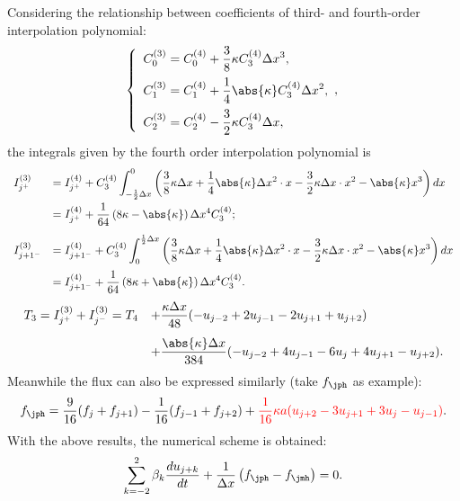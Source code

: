 \documentclass[]{article}
\begin{document}
Considering the relationship between coefficients of third- and fourth-order
interpolation polynomial:
\begin{equation}
  \left\{\begin{array}{l}
  \displaystyle
  C_0^{(3)}=C_0^{(4)}+\frac{3}{8}\kappa C_3^{(4)}\Delta x^3, \\[3mm]
  \displaystyle
  C_1^{(3)}=C_1^{(4)}+\frac{1}{4}\abs{\kappa} C_3^{(4)}\Delta x^2, \\[3mm]
  \displaystyle
  C_2^{(3)}=C_2^{(4)}-\frac{3}{2}\kappa C_3^{(4)}\Delta x, \\
  \end{array},\right. 
  \label{eq:C3-C4}
\end{equation}
the integrals given by the fourth order interpolation polynomial is
\[
\begin{array}{ll}
  I^{(3)}_{j^+}&\displaystyle =I^{(4)}_{j^+}+C_3^{(4)}\int_{-\frac{1}{2}\Delta x}^0 \left(\frac{3}{8}\kappa \Delta x +\frac{1}{4}\abs{\kappa}\Delta x^2\cdot x -\frac{3}{2}\kappa \Delta x\cdot x^2 -\abs{\kappa}x^3\right) dx \\[4mm]
  &\displaystyle = I^{(4)}_{j^+}+\frac{1}{64}\left(8\kappa-\abs{\kappa}\right)\Delta x^4C_3^{(4)}; \\[4mm]
  I^{(3)}_{j+1^-}&\displaystyle =I^{(4)}_{j+1^-}+C_3^{(4)}\int_0^{\frac{1}{2}\Delta x} \left(\frac{3}{8}\kappa \Delta x +\frac{1}{4}\abs{\kappa}\Delta x^2\cdot x -\frac{3}{2}\kappa \Delta x\cdot x^2 -\abs{\kappa}x^3\right) dx \\[4mm]
  &\displaystyle= I^{(4)}_{j+1^-}+\frac{1}{64}\left(8\kappa+\abs{\kappa}\right)\Delta x^4C_3^{(4)}.\\
\end{array}
\]
\[
\begin{array}{ll}
  T_3 = I^{(3)}_{j^+}+ I^{(3)}_{j^-} = T_4&\displaystyle +\frac{\kappa\Delta x}{48}(-u_{j-2}+2u_{j-1}-2u_{j+1}+u_{j+2}) \\[4mm]
  &\displaystyle +\frac{\abs{\kappa}\Delta x}{384} (-u_{j-2}+4u_{j-1}-6u_j+4u_{j+1}-u_{j+2}). \\
\end{array}
\]
Meanwhile the flux can also be expressed similarly (take $f_\jph$ as example):
\[
f_{\jph}=\frac{9}{16}(f_j+f_{j+1})-\frac{1}{16}(f_{j-1}+f_{j+2})+{\color{red}\frac{1}{16}\kappa a(u_{j+2}-3u_{j+1}+3u_{j}-u_{j-1})}.
\]
With the above results, the numerical scheme is obtained:
\begin{equation}
  \sum_{k=-2}^2\beta_k \frac{d u_{j+k}}{dt}+\frac{1}{\Delta
    x}\left(f_{\jph}-f_{\jmh}\right)=0.
  \label{eq:QUICK-duj-dt-nodal}
\end{equation}
\end{document}
